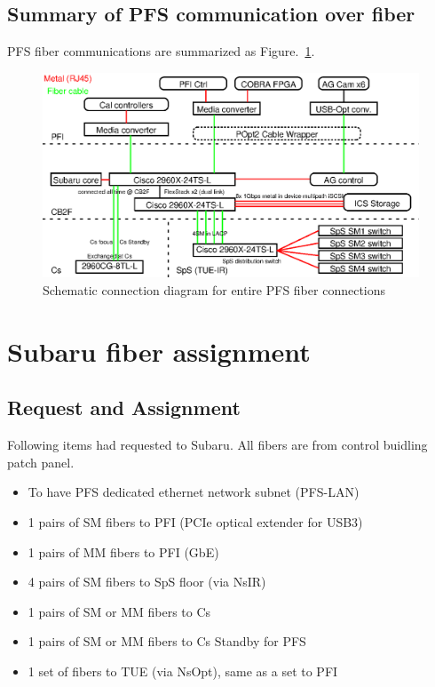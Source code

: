\documentclass[a4paper,notitlepage]{article}
\begin{document}
\subsection{Summary of PFS communication over fiber}

PFS fiber communications are summarized as Figure.~\ref{fig:fiber-connection}. 

\begin{figure}[htb]
  \begin{center}
    \includegraphics{networks-list.eps}
  \end{center}
  \caption{Schematic connection diagram for entire PFS fiber connections}
  \label{fig:fiber-connection}
\end{figure}


\section{Subaru fiber assignment}

\subsection{Request and Assignment}

Following items had requested to Subaru. 
All fibers are from control buidling patch panel. 

\begin{itemize}
  \item To have PFS dedicated ethernet network subnet (PFS-LAN)
  \item 1 pairs of SM fibers to PFI (PCIe optical extender for USB3)
  \item 1 pairs of MM fibers to PFI (GbE)
  \item 4 pairs of SM fibers to SpS floor (via NsIR)
  \item 1 pairs of SM or MM fibers to Cs
  \item 1 pairs of SM or MM fibers to Cs Standby for PFS
  \item 1 set of fibers to TUE (via NsOpt), same as a set to PFI
\end{itemize}
\end{document}
